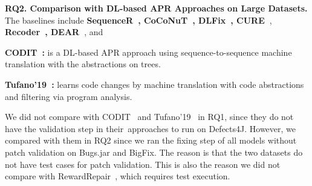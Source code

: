 \vspace{2pt} {\bf RQ2. Comparison with DL-based APR Approaches on
  Large Datasets.} The baselines include {\bf
  Sequen\-ceR~\cite{chen2018sequencer},
  CoCoNuT~\cite{lutellier2020coconut}, DLFix~\cite{icse20},
  CURE~\cite{cure-icse21}}, {\bf Recoder~\cite{recoder-fse21},
  DEAR~\cite{icse22}}, and

{\bf CODIT~\cite{chakrabortycodit}:} is a DL-based APR approach
using sequence-to-sequence machine translation with the
abstractions on trees.

{\bf Tufano'19~\cite{tufano2019learning}:} learns code changes by
machine translation with code abstractions and
filtering via program analysis.

We did not compare with CODIT~\cite{chakrabortycodit} and
Tufano'19~\cite{tufano2019learning} in RQ1, since they do not have
the validation step in their~approaches to run on Defects4J.
%
However, we compared {\tool} with them in RQ2 since we ran the fixing
step of all models without patch validation on Bugs.jar and
BigFix. The reason is that the two datasets do not have test cases for
patch validation. This is also the reason we did not compare with
RewardRepair~\cite{monperrus-icse22}, which requires test execution.





